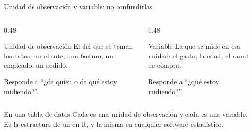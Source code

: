 \documentclass[aspectratio=169,10pt]{beamer}
\begin{document}
\begin{frame}{Unidad de observación y variable: no confundirlas}
  \begin{columns}[T,onlytextwidth]
    \begin{column}{0.48\textwidth}
      \begin{block}{Unidad de observación}
        \footnotesize
        El  del que se toman los datos: un cliente, una factura,
        un empleado, un pedido.

        \vspace{0.1cm}
        Responde a ``¿de quién o de qué estoy midiendo?''.
      \end{block}
    \end{column}
    \begin{column}{0.48\textwidth}
      \begin{exampleblock}{Variable}
        \footnotesize
        La  que se mide en esa unidad: el gasto, la edad,
        el canal de compra.

        \vspace{0.1cm}
        Responde a ``¿qué estoy midiendo?''.
      \end{exampleblock}
    \end{column}
  \end{columns}

  \vspace{0.3cm}
  \begin{alertblock}{En una tabla de datos}
    \footnotesize
    Cada  es una unidad de observación y cada
     es una variable. Es la estructura de un
     en R, y la misma en cualquier software estadístico.
  \end{alertblock}
\end{frame}
\end{document}
